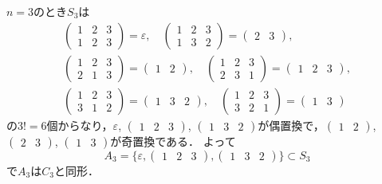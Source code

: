  $n=3$のとき$S_3$は
\begin{equation}
\begin{split}
   \begin{pmatrix}1&2&3\\1&2&3\end{pmatrix}=\varepsilon,\quad
   \begin{pmatrix}1&2&3\\1&3&2\end{pmatrix}
   =
   \begin{pmatrix}
      2&3
   \end{pmatrix},\\
   \begin{pmatrix}1&2&3\\2&1&3\end{pmatrix}
   =\begin{pmatrix}
      1&2
   \end{pmatrix},\quad
   \begin{pmatrix}1&2&3\\2&3&1\end{pmatrix}
   =\begin{pmatrix}
      1&2&3
   \end{pmatrix},\\
   \begin{pmatrix}1&2&3\\3&1&2\end{pmatrix}=
   \begin{pmatrix}
      1&3&2
   \end{pmatrix},\quad
   \begin{pmatrix}1&2&3\\3&2&1\end{pmatrix}=
   \begin{pmatrix}
      1&3
   \end{pmatrix}
\end{split}\label{S3}
\end{equation}
の$3!=6$個からなり，$\varepsilon$, $\begin{pmatrix}
          1&2&3
     \end{pmatrix}$, $\begin{pmatrix}
          1&3&2
     \end{pmatrix}$が偶置換で，$\begin{pmatrix}
          1&2
     \end{pmatrix}$, $\begin{pmatrix}
          2&3
     \end{pmatrix}$, $\begin{pmatrix}
          1&3
     \end{pmatrix}$が奇置換である．
よって
\[
     A_3 = \{
     \varepsilon, 
     \begin{pmatrix}
          1&2&3
     \end{pmatrix},
     \begin{pmatrix}
          1&3&2
     \end{pmatrix} \}\subset S_3
\]
で$A_3$は$C_3$と同形．
\emptyline

